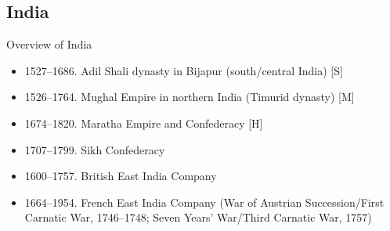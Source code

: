 \subsection{India}
\begin{frame}{Overview of India}
	\begin{itemize}
		\item<4-5,7-10,12->1527--1686. Adil Shali dynasty in Bijapur (south/central India) [S]
		\item<5,7-10,12->1526--1764. Mughal Empire in northern India (Timurid dynasty) [M]
		\item<7-10,12->1674--1820. Maratha Empire and Confederacy [H]
		\item<8-10,12->1707--1799. Sikh Confederacy
		\item<9-10,12->1600--1757. British East India Company
		\item<10,12->1664--1954. French East India Company (War of Austrian Succession/First Carnatic War, 1746--1748; Seven Years' War/Third Carnatic War, 1757)
	\end{itemize}
\end{frame}